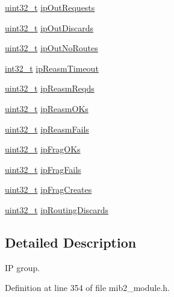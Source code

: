 \begin{DoxyCompactItemize}
\item 
\hyperlink{stdint_8h_a435d1572bf3f880d55459d9805097f62}{uint32\+\_\+t} \hyperlink{structMib2IpGroup_ac2e4119ce4aa90c4cc558a49b76c0f9d}{ip\+Out\+Requests}
\item 
\hyperlink{stdint_8h_a435d1572bf3f880d55459d9805097f62}{uint32\+\_\+t} \hyperlink{structMib2IpGroup_af134164fa458e68e2c9ba286397e0d87}{ip\+Out\+Discards}
\item 
\hyperlink{stdint_8h_a435d1572bf3f880d55459d9805097f62}{uint32\+\_\+t} \hyperlink{structMib2IpGroup_adab5e32eaaa3d0862812a2fd426c9a4c}{ip\+Out\+No\+Routes}
\item 
\hyperlink{stdint_8h_ab1967d8591af1a4e48c37fd2b0f184d0}{int32\+\_\+t} \hyperlink{structMib2IpGroup_a12b7f36fd1a5a87f313afc38e1afec09}{ip\+Reasm\+Timeout}
\item 
\hyperlink{stdint_8h_a435d1572bf3f880d55459d9805097f62}{uint32\+\_\+t} \hyperlink{structMib2IpGroup_a01b23a17d3b324f2c8b5a9bf5af07970}{ip\+Reasm\+Reqds}
\item 
\hyperlink{stdint_8h_a435d1572bf3f880d55459d9805097f62}{uint32\+\_\+t} \hyperlink{structMib2IpGroup_a4674e7d36c354eadb8e247b855ba21ce}{ip\+Reasm\+O\+Ks}
\item 
\hyperlink{stdint_8h_a435d1572bf3f880d55459d9805097f62}{uint32\+\_\+t} \hyperlink{structMib2IpGroup_ae50a0f47aecda654c1f5576261e3a6ef}{ip\+Reasm\+Fails}
\item 
\hyperlink{stdint_8h_a435d1572bf3f880d55459d9805097f62}{uint32\+\_\+t} \hyperlink{structMib2IpGroup_a1908d5ffdd06d40f7f77f600036626ba}{ip\+Frag\+O\+Ks}
\item 
\hyperlink{stdint_8h_a435d1572bf3f880d55459d9805097f62}{uint32\+\_\+t} \hyperlink{structMib2IpGroup_a82efb15e26167cb8fd5f3b5cd5f0507a}{ip\+Frag\+Fails}
\item 
\hyperlink{stdint_8h_a435d1572bf3f880d55459d9805097f62}{uint32\+\_\+t} \hyperlink{structMib2IpGroup_a18ae811c39f9ab95853e1e9143bb278c}{ip\+Frag\+Creates}
\item 
\hyperlink{stdint_8h_a435d1572bf3f880d55459d9805097f62}{uint32\+\_\+t} \hyperlink{structMib2IpGroup_a01af1a9f05e5883691cd5c6dacfbe2d1}{ip\+Routing\+Discards}
\end{DoxyCompactItemize}


\subsection{Detailed Description}
IP group. 

Definition at line 354 of file mib2\+\_\+module.\+h.



